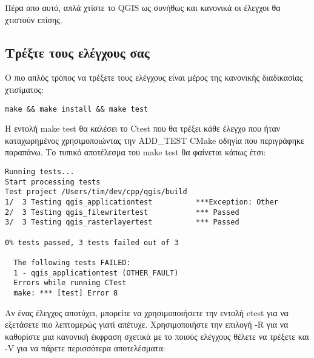 Πέρα απο αυτό, απλά χτίστε το QGIS ως συνήθως και κανονικά οι έλεγχοι θα χτιστούν επίσης.

\hypertarget{toc53}{}
\subsection{Τρέξτε τους ελέγχους σας}
Ο πιο απλός τρόπος να τρέξετε τους ελέγχους είναι μέρος της κανονικής διαδικασίας χτισίματος:

\begin{verbatim}
make && make install && make test
\end{verbatim}

Η εντολή make test θα καλέσει το Ctest που θα τρέξει κάθε έλεγχο που ήταν καταχωρημένος χρησιμοποιώντας την ADD\_TEST CMake οδηγία που περιγράφηκε παραπάνω. Το τυπικό αποτέλεσμα του make test θα φαίνεται κάπως έτσι:

\begin{verbatim}
Running tests...
Start processing tests
Test project /Users/tim/dev/cpp/qgis/build
1/  3 Testing qgis_applicationtest          ***Exception: Other
2/  3 Testing qgis_filewritertest           *** Passed
3/  3 Testing qgis_rasterlayertest          *** Passed

0% tests passed, 3 tests failed out of 3

  The following tests FAILED:
  1 - qgis_applicationtest (OTHER_FAULT)
  Errors while running CTest
  make: *** [test] Error 8
\end{verbatim}

Αν ένας έλεγχος αποτύχει, μπορείτε να χρησιμοποιήσετε την εντολή ctest για να εξετάσετε πιο λεπτομερώς γιατί απέτυχε. Χρησιμοποιήστε την επιλογή -R για να καθορίστε μια κανονική έκφραση σχετικά με το ποιούς ελέγχους θέλετε να τρέξετε και -V για να πάρετε περισσότερα αποτελέσματα:

